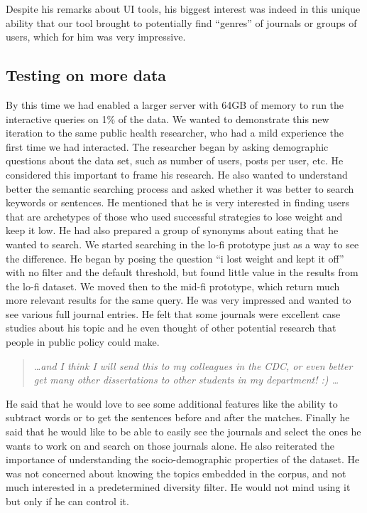 \documentclass{sigchi}
\begin{document}
Despite his remarks about UI tools, his biggest interest was indeed in this unique ability that our tool brought to potentially find ``genres'' of journals or groups of users, which for him was very impressive.

\subsection{Testing on more data}

By this time we had enabled a larger server with  64GB of memory to run the interactive queries on 1\% of the data. We wanted to demonstrate this new iteration to the same public health researcher, who had a mild experience the first time we had interacted. 
The researcher began by asking demographic questions about the data set, such as number of users, posts per user, etc. He considered this important to frame his research. He also wanted to understand better the semantic searching process and asked whether it was better to search keywords or sentences. He mentioned that he is very interested in finding users that are archetypes of those who used successful strategies to lose weight and keep it low. He had also prepared a group of synonyms about eating that he wanted to search. We started searching in the lo-fi prototype just as a way to see the difference. He began by posing the question ``i lost weight and kept it off'' with no filter and the default threshold, but found little value in the results from the lo-fi dataset. We moved then to the mid-fi prototype, which return much more relevant results for the same query. He was very impressed and wanted to see various full journal entries. He felt that some journals were excellent case studies about his topic and he even thought of other potential research that people in public policy could make. 

\begin{quote}
{\em
\dots and I think I will send this to my colleagues in the CDC, or even better get many other dissertations to other students in my department! :) \dots
}\end{quote}

He said that he would love to see some additional features like the ability to subtract words or to get the sentences before and after the matches. Finally he said that he would like to be able to easily see the journals and select the ones he wants to work on and search on those journals alone. He also reiterated the importance of understanding the socio-demographic properties of the dataset. He was not concerned about knowing the topics embedded in the corpus, and not much interested in a predetermined diversity filter. He would not mind using it but only if he can control it.
\end{document}
